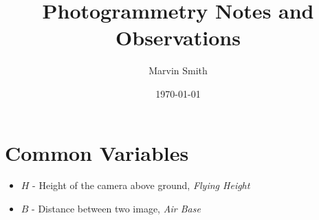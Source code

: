 \documentclass[12pt]{report}
\title{Photogrammetry Notes and Observations}
\author{Marvin Smith}
\date{\today}
\begin{document}
\maketitle

\tableofcontents
\clearpage



\chapter*{Common Variables}

\begin{itemize}
\item $H$ - Height of the camera above ground, \emph{Flying Height}
\item $B$ - Distance between two image, \emph{Air Base}
\end{itemize}






\glsaddall
\printglossary




\nocite{*}

\printindex
\end{document}
